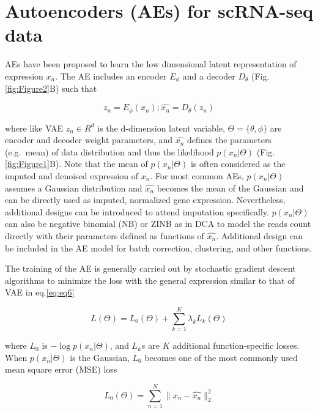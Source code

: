 \documentclass[
]{book}
\begin{document}
\hypertarget{ch-3-2}{%
\section{Autoencoders (AEs) for scRNA-seq data}\label{ch-3-2}}

AEs have been proposed to learn the low dimensional latent representation of expression \(x_{n}\). The AE includes an encoder \(E_{\phi}\) and a decoder \(D_{\theta}\) (Fig.\ref{fig:Figure2}B) such that

\begin{equation}
    z_{n}=E_{\phi}(x_{n}); \hat{x_{n}} = D_{\theta}(z_{n})  \label{eq:eq7}
\end{equation}

where like VAE \(z_{n} \in R^{d}\) is the d-dimension latent variable, \(\Theta = \{\theta,\phi\}\) are encoder and decoder weight parameters, and \(\hat{x_{n}}\) defines the parameters (e.g.~mean) of data distribution and thus the likelihood \(p(x_{n} \vert \Theta)\) (Fig.\ref{fig:Figure1}B). Note that the mean of \(p(x_{n}\vert \Theta)\) is often considered as the imputed and denoised expression of \(x_{n}\). For most common AEs, \(p(x_{n}\vert \Theta)\) assumes a Gaussian distribution and \(\hat{x_{n}}\) becomes the mean of the Gaussian and can be directly used as imputed, normalized gene expression. Nevertheless, additional designs can be introduced to attend imputation specifically. \(p(x_{n}\vert \Theta)\) can also be negative binomial (NB) or ZINB as in DCA \citep{RN80} to model the reads count directly with their parameters defined as functions of \(\hat{x_{n}}\). Additional design can be included in the AE model for batch correction, clustering, and other functions.

The training of the AE is generally carried out by stochastic gradient descent algorithms to minimize the loss with the general expression similar to that of VAE in eq.\eqref{eq:eq6}

\begin{equation}
    L(\Theta)=L_{0}(\Theta)+\sum_{k=1}^{K}\lambda_{k}L_{k}(\Theta) \label{eq:eq8}
\end{equation}

where \(L_{0}\) is \(-\log{p(x_{n}\vert \Theta)}\), and \(L_{k}s\) are \(K\) additional function-specific losses. When \(p(x_{n} \vert \Theta)\) is the Gaussian, \(L_{0}\) becomes one of the most commonly used mean square error (MSE) loss

\begin{equation}
L_{0}(\Theta)=\sum_{n=1}^{N}\|x_{n}-\hat{x_{n}}\|_{2}^{2} \label{eq:eq9}
\end{equation}
\end{document}
